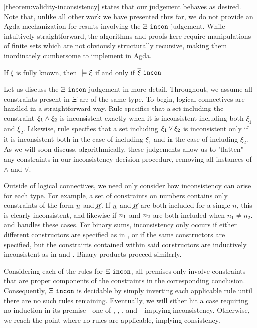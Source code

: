 \autoref{theorem:validity-inconsistency} states that our judgement behaves as desired. Note that, unlike all other work we have presented thus far, we do not provide an Agda mechanization for results involving the $\Xi ~\mathtt{incon}$ judgement.  While intuitively straightforward, the algorithms and proofs here require manipulations of finite sets which are not obviously structurally recursive, making them inordinately cumbersome to implement in Agda.

\begin{theorem}
\label{theorem:validity-inconsistency}
If $\xi$ is fully known, then $\; \models \xi$ if and only if\; $\overline{\xi} ~\mathtt{incon}$
\end{theorem}

Let us discuss the $\Xi ~\mathtt{incon}$ judgement in more detail. Throughout, we assume all constraints present in $\Xi$ are of the same type. To begin, logical connectives are handled in a straightforward way. Rule \CINCAnd specifies that a set including the constraint $\xi_1 \wedge \xi_2$ is inconsistent exactly when it is inconsistent including both $\xi_1$ and $\xi_2$. Likewise, rule \CINCOr specifies that a set including $\xi_1 \vee \xi_2$ is inconsistent only if it is inconsistent both in the case of including $\xi_1$ and in the case of including $\xi_2$. As we will soon discuss, algorithmically, these judgements allow us to "flatten" any constraints in our inconsistency decision procedure, removing all instances of $\land$ and $\lor$.

Outside of logical connectives, we need only consider how inconsistency can arise for each type. For example, a set of constraints on numbers contains only constraints of the form $\underline{n}$ and $\underline{\cancel{n}}$. If $\underline{n}$ and $\underline{\cancel{n}}$ are both included for a single $n$, this is clearly inconsistent, and likewise if $\underline{n_1}$ and $\underline{n_2}$ are both included when $n_1 \neq n_2$. \CINCNum and \CINCNotNum handles these cases. For binary sums, inconsistency only occurs if either different constructors are specified as in \CINCInj, or if the same constructors are specified, but the constraints contained within said constructors are inductively inconsistent as in \CINCInl and \CINCInr. Binary products proceed similarly.



Considering each of the rules for $\Xi ~\mathtt{incon}$, all premises only involve constraints that are proper components of the constraints in the corresponding conclusion. Consequently, $\Xi ~\mathtt{incon}$ is decidable by simply inverting each applicable rule until there are no such rules remaining. Eventually, we will either hit a case requiring no induction in its premise - one of \CINCFalsity, \CINCNum, \CINCNotNum, and \CINCInj - implying inconsistency. Otherwise, we reach the point where no rules are applicable, implying consistency. 

